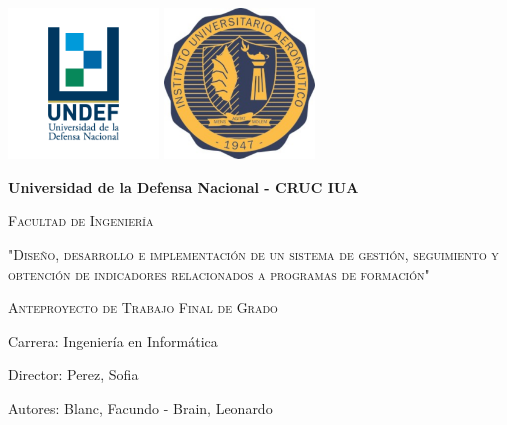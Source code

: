 \begin{titlepage}
	\centering
	\includegraphics[width=0.3\textwidth]{imagenes/undef}
	\includegraphics[width=0.3\textwidth]{imagenes/iua}\\
	\vspace{1cm}
	{\bfseries\LARGE Universidad de la Defensa Nacional - CRUC IUA \par}
	\vspace{1cm}
	{\scshape\Large Facultad de Ingenier\'ia \par}
	\vspace{2cm}
	{\scshape\Large "Diseño, desarrollo e implementación de un sistema de gestión, seguimiento y obtención de indicadores relacionados a programas de formación" \par}
	\vspace{1cm}
	{\scshape\Large Anteproyecto de Trabajo Final de Grado \par}
	\begin{flushleft}
	\vfill
	\vspace{0.5cm}
	{\Large Carrera: Ingeniería en Informática\par}
	\vspace{0.5cm}
	{\Large Director: Perez, Sofia\par}
	\vspace{0.5cm}
	{\Large Autores: Blanc, Facundo - Brain, Leonardo\par}
	\vfill
	\end{flushleft}
\end{titlepage}